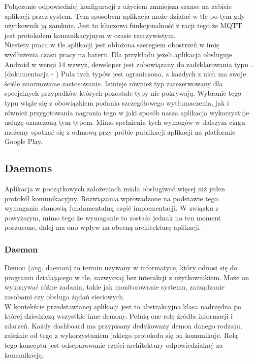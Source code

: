 Połączenie odpowiedniej konfiguracji z użyciem  zmniejsza szanse na zabicie aplikacji przez system. Tym sposobem aplikacja może działać w tle po tym gdy użytkownik ją zamknie. Jest to kluczowa funkcjonalność z racji tego że MQTT jest protokołem komunikacyjnym w czasie rzeczywistym.\\

Niestety praca w tle aplikacji jest obłożona szeregiem obostrzeń w imię wydłużenia czasu pracy na baterii. Dla przykładu jeżeli aplikacja obsługuje Android w wersji 14 wzwyż, deweloper jest zobowiązany do zadeklarowania typu . (dokumentacja - \cite{fgstyperequired}) Pula tych typów jest ograniczona, a każdych z nich ma swoje ściśle unormowane zastosowanie. Istnieje również typ zarezerwowany dla specjalnych przypadków których pozostałe typy nie pokrywają. Wybranie tego typu wiąże się z obowiązkiem podania szczegółowego wytłumaczenia, jak i również przygotowania nagrania tego w jaki sposób nasza aplikacja wykorzystuje usługę oznaczoną tym typem. Mimo spełnienia tych wymogów w dalszym ciągu możemy spotkać się z odmową przy próbie publikacji aplikacji na platformie Google Play.

\newpage

\subsection{Daemons}
Aplikacja w początkowych założeniach miała obsługiwać więcej niż jeden protokół komunikacyjny. Rozwiązania wprowadzone na podstawie tego wymagania stanowią fundamentalną część implementacji. W związku z powyższym, mimo tego że wymaganie to zostało jednak na ten moment porzucone, dalej ma ono wpływ na obecną architekturę aplikacji.

\subsubsection{Daemon}
Demon (ang. daemon) to termin używany w informatyce, który odnosi się do programu działającego w tle, zazwyczaj bez interakcji z użytkownikiem. Może on wykonywać różne zadania, takie jak monitorowanie systemu, zarządzanie zasobami czy obsługa żądań sieciowych.\\

W kontekście przedstawianej aplikacji jest to abstrakcyjna klasa nadrzędna po której dziedziczą wszystkie inne demony. Pełnią one rolę źródła informacji i zdarzeń. Każdy dashboard ma przypisany dedykowany demon danego rodzaju, zależnie od tego z wykorzystaniem jakiego protokołu się on komunikuje. Rolą tego konceptu jest odseparowanie części architektury odpowiedzialnej za komunikację.\\

